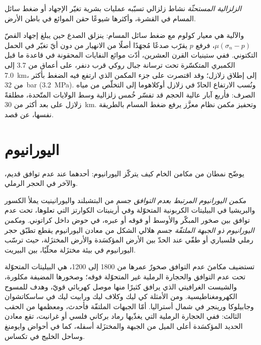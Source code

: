 \begin{definition}\label{def:b2:energy-geology:induced}
\emph{الزلزالية المستحثّة} نشاط زلزالي تسبّبه عمليات
بشرية تغيّر الإجهاد أو ضغط سائل المسام في القشرة، وأكثرها شيوعًا
حقن الموائع في باطن الأرض.
\end{definition}

والآلية هي معيار كولوم مع ضغط سائل المسام: ينزلق الصدع حين يبلغ إجهاد القصّ
$\mu(\sigma_n - p)$، فرفع $p$ يقرّب صدعًا مُجهَدًا أصلًا من الانهيار
من دون أيّ تغيّر في الحمل التكتوني. ففي ستينيات القرن العشرين، أدّت موائع النفايات المحقونة في
قاعدة ما قبل الكمبري المتكسّرة تحت ترسانة جبال روكي قرب دنفر، على أعماق من 3.7 إلى
\qty{7.0}{km}، إلى إطلاق زلازل؛ وقد اقتصرت على جزء المكمن الذي
ارتفع فيه الضغط بأكثر من \qty{32}{bar} (\qty{3.2}{MPa}). ونُسب الارتفاع الحادّ في زلازل
أوكلاهوما إلى التخلّص من مياه الصرف: فأربع آبار عالية الحجم
قد تفسّر خُمس زلزالية وسط الولايات المتّحدة، مطلقةً
زلازل على بعد أكثر من \qty{30}{km}. وتحفيز مكمن نظام معزَّز يرفع ضغط المسام
بالطريقة نفسها، عن قصد.

\section{اليورانيوم}\label{sec:b2:energy-geology:uranium}

يوضّح نمطان من مكامن الخام كيف يتركّز اليورانيوم: أحدهما عند عدم توافق قديم، والآخر
في الحجر الرملي.

\begin{definition}\label{def:b2:energy-geology:uranium}
\emph{مكمن اليورانيوم المرتبط بعدم التوافق} جسم
من البتشبلند واليورانينيت يملأ الكسور والبريشيا في البيليتات الكربونية المتحوّلة وفي
أرينيتات الكوارتز التي تعلوها، تحت عدم توافق بين صخور  المبكّر والأوسط أو فوقه أو عبره، في حوض
داخل كراتوني. و\emph{مكمن اليورانيوم ذو الجبهة الملتفّة}
جسم هلالي الشكل من معادن اليورانيوم يقطع تطبّق حجر رملي
فلسباري أو طفّي عند الحدّ بين الأرض المؤكسَدة والأرض المختزَلة، حيث
ترسّب اليورانيوم في بيئة مختزَلة محلّيًا، بين البيريت.
\end{definition}

تستضيف مكامنَ عدم التوافق صخورٌ عمرها من 1800 إلى \qty{1200}{\Ma}، هي البيليتات المتحوّلة
تحت عدم التوافق والحجارة الرملية غير المتحوّلة فوقه؛ وصخورها المضيفة مكلورة، والشيست الغرافيتي الذي
يرافق كثيرًا منها موصل كهربائي قويّ، وهدف للمسوح الكهرومغناطيسية. ومن الأمثلة
كي ليك وكلاف ليك ورابيت ليك في ساسكاتشوان وجابيلوكا ورينجر في شمال أستراليا.
أمّا الجبهات الملتفّة فأحدث، ومعظمها من الحقب الثالث: ففي الحجارة الرملية التي يغذّيها رماد بركاني فلسي أو
غرانيت، تقع معادن الحديد المؤكسَدة أعلى الميل من الجبهة والمختزَلة أسفله، كما في أحواض
وايومنغ وساحل الخليج في تكساس.

